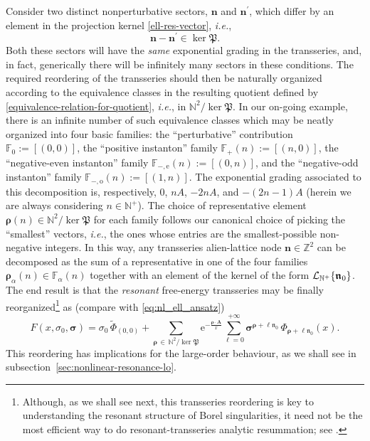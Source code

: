 \documentclass[11pt,a4paper]{article}
\newcommand{\CL}{{\cal L}}
\def\BN{{\mathbb N}}
\def\BF{{\mathbb F}}
\newcommand{\be}{\begin{equation}}
\newcommand{\ee}{\end{equation}}
\newcommand{\nres}{\boldsymbol{\mathfrak{n}}_0}
\begin{document}
Consider two distinct nonperturbative sectors, $\boldsymbol{n}$ and $\boldsymbol{n}^\prime$, which differ by an element in the projection kernel \eqref{ell-res-vector}, \textit{i.e.},
%
\be
\label{equivalence-relation-for-quotient}
\boldsymbol{n} - \boldsymbol{n}^\prime \in \ker \mathfrak{P}.
\ee
%
\noindent
Both these sectors will have the \textit{same} exponential grading in the transseries, and, in fact, generically there will be infinitely many sectors in these conditions. The required reordering of the transseries should then be naturally organized according to the equivalence classes in the resulting quotient defined by \eqref{equivalence-relation-for-quotient}, \textit{i.e.}, in $\BN^2 / \ker \mathfrak{P}$. In our on-going example, there is an infinite number of such equivalence classes which may be neatly organized into four basic families: the ``perturbative'' contribution $\BF_0 := [(0,0)]$, the ``positive instanton'' family $\BF_{+} (n) := [(n,0)]$, the ``negative-even instanton'' family $\BF_{-,\text{e}} (n) := [(0,n)]$, and the ``negative-odd instanton'' family $\BF_{-,\text{o}} (n) := [(1,n)]$. The exponential grading associated to this decomposition is, respectively, $0$, $nA$, $-2nA$, and $-(2n-1)A$ (herein we are always considering $n \in \BN^+$). The choice of representative element $\boldsymbol{\rho} (n) \in \BN^2 / \ker \mathfrak{P}$ for each family follows our canonical choice of picking the ``smallest'' vectors, \textit{i.e.}, the ones whose entries are the smallest-possible non-negative integers. In this way, any transseries alien-lattice node $\boldsymbol{n} \in \mathbb{Z}^2$ can be decomposed as the sum of a representative in one of the four families $\boldsymbol{\rho}_\alpha (n) \in \BF_\alpha (n)$ together with an element of the kernel of the form $\CL_{\BN^+} \{\nres\}$. The end result is that the \textit{resonant} free-energy transseries may be finally reorganized\footnote{Although, as we shall see next, this transseries reordering is key to understanding the resonant structure of Borel singularities, it need not be the most efficient way to do resonant-transseries analytic resummation; see \cite{asv18a}.} as (compare with \eqref{eq:nl_ell_ansatz})
%
\be
\label{eq:nl_ell_ansatz-res}
F \left( x, \sigma_0, \boldsymbol{\sigma} \right) = \sigma_0\, \widetilde{\Phi}_{(0,0)} + \sum_{\boldsymbol{\rho}\, \in\, \BN^2/\ker \mathfrak{P}} \mathrm{e}^{- \frac{\boldsymbol{\rho} \cdot \boldsymbol{A}}{x}} \sum_{\ell=0}^{+\infty} \boldsymbol{\sigma}^{\boldsymbol{\rho} + \ell \nres}\, \Phi_{\boldsymbol{\rho} + \ell \nres}(x).
\ee
%
\noindent
This reordering has implications for the large-order behaviour, as we shall see in subsection~\ref{sec:nonlinear-resonance-lo}.
\end{document}
